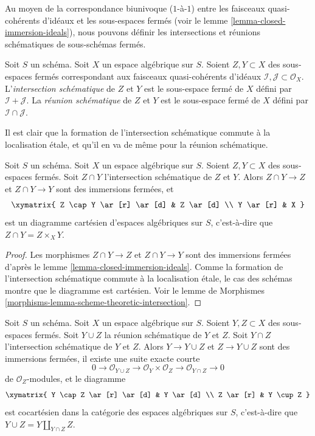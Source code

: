 \noindent
Au moyen de la correspondance biunivoque ($1$-à-$1$) entre les faisceaux quasi-cohérents
d'idéaux et les sous-espaces fermés (voir le
lemme \ref{lemma-closed-immersion-ideals}),
nous pouvons définir les intersections et réunions schématiques
de sous-schémas fermés.

\begin{definition}
\label{definition-scheme-theoretic-intersection-union}
Soit $S$ un schéma. Soit $X$ un espace algébrique sur $S$.
Soient $Z, Y \subset X$ des sous-espaces fermés
correspondant aux faisceaux quasi-cohérents d'idéaux
$\mathcal{I}, \mathcal{J} \subset \mathcal{O}_X$.
L'{\it intersection schématique} de $Z$ et $Y$
est le sous-espace fermé de $X$ défini par $\mathcal{I} + \mathcal{J}$.
La {\it réunion schématique} de $Z$ et $Y$
est le sous-espace fermé de $X$ défini par
$\mathcal{I} \cap \mathcal{J}$.
\end{definition}

\noindent
Il est clair que la formation de l'intersection schématique
commute à la localisation étale, et qu'il en va de même pour la
réunion schématique.

\begin{lemma}
\label{lemma-scheme-theoretic-intersection}
Soit $S$ un schéma. Soit $X$ un espace algébrique sur $S$.
Soient $Z, Y \subset X$ des sous-espaces fermés.
Soit $Z \cap Y$ l'intersection schématique de $Z$ et $Y$.
Alors $Z \cap Y \to Z$ et $Z \cap Y \to Y$ sont des immersions fermées,
et
$$
\xymatrix{
Z \cap Y \ar[r] \ar[d] & Z \ar[d] \\
Y \ar[r] & X
}
$$
est un diagramme cartésien d'espaces algébriques sur $S$, c'est-à-dire que
$Z \cap Y = Z \times_X Y$.
\end{lemma}

\begin{proof}
Les morphismes $Z \cap Y \to Z$ et $Z \cap Y \to Y$ sont des immersions fermées
d'après le lemme \ref{lemma-closed-immersion-ideals}.
Comme la formation de l'intersection schématique commute
à la localisation étale, le cas des schémas montre que le diagramme est cartésien.
Voir le
lemme de Morphismes \ref{morphisms-lemma-scheme-theoretic-intersection}.
\end{proof}

\begin{lemma}
\label{lemma-scheme-theoretic-union}
Soit $S$ un schéma. Soit $X$ un espace algébrique sur $S$.
Soient $Y, Z \subset X$ des sous-espaces fermés.
Soit $Y \cup Z$ la réunion schématique de $Y$ et $Z$.
Soit $Y \cap Z$ l'intersection schématique de $Y$ et $Z$.
Alors $Y \to Y \cup Z$ et $Z \to Y \cup Z$ sont des immersions fermées,
il existe une suite exacte courte
$$
0 \to \mathcal{O}_{Y \cup Z} \to \mathcal{O}_Y \times \mathcal{O}_Z
\to \mathcal{O}_{Y \cap Z} \to 0
$$
de $\mathcal{O}_Z$-modules, et le diagramme
$$
\xymatrix{
Y \cap Z \ar[r] \ar[d] & Y \ar[d] \\
Z \ar[r] & Y \cup Z
}
$$
est cocartésien dans la catégorie des espaces algébriques sur $S$, c'est-à-dire que
$Y \cup Z = Y \amalg_{Y \cap Z} Z$.
\end{lemma}

